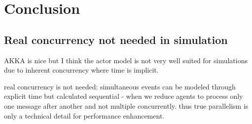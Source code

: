 \documentclass{article}
\begin{document}
\section{Conclusion}
\subsection{Real concurrency not needed in simulation}
AKKA is nice but I think the actor model is not very well suited for simulations  due to inherent concurrency where time is implicit. 

real concurrency is not needed: simultaneous events can be modeled through explicit time but calculated sequential - when we reduce agents to process only one message after another and not multiple concurrently. thus true parallelism is only a technical detail for performance enhancement.






\end{document}
